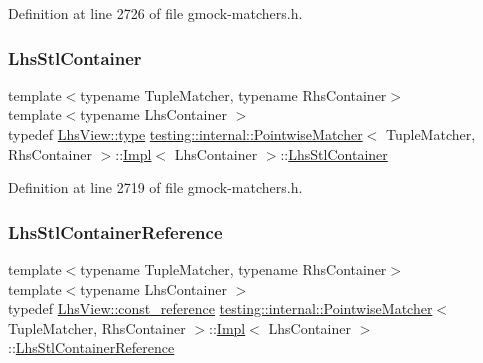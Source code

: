 Definition at line 2726 of file gmock-\/matchers.\+h.

\mbox{\label{classtesting_1_1internal_1_1PointwiseMatcher_1_1Impl_a23420b57b4cd6d83cec8afda746c27f2}} 
\subsubsection{\texorpdfstring{Lhs\+Stl\+Container}{LhsStlContainer}}
{\footnotesize\ttfamily template$<$typename Tuple\+Matcher, typename Rhs\+Container$>$ \\
template$<$typename Lhs\+Container $>$ \\
typedef \hyperlink{classtesting_1_1internal_1_1StlContainerView_a2b2c63a6dcdbfe63fb0ee121ebf463ba}{Lhs\+View\+::type} \hyperlink{classtesting_1_1internal_1_1PointwiseMatcher}{testing\+::internal\+::\+Pointwise\+Matcher}$<$ Tuple\+Matcher, Rhs\+Container $>$\+::\hyperlink{classtesting_1_1internal_1_1PointwiseMatcher_1_1Impl}{Impl}$<$ Lhs\+Container $>$\+::\hyperlink{classtesting_1_1internal_1_1PointwiseMatcher_1_1Impl_a23420b57b4cd6d83cec8afda746c27f2}{Lhs\+Stl\+Container}}



Definition at line 2719 of file gmock-\/matchers.\+h.

\mbox{\label{classtesting_1_1internal_1_1PointwiseMatcher_1_1Impl_a9df3eb0866f76d59dbdd35fafeb5590c}} 
\subsubsection{\texorpdfstring{Lhs\+Stl\+Container\+Reference}{LhsStlContainerReference}}
{\footnotesize\ttfamily template$<$typename Tuple\+Matcher, typename Rhs\+Container$>$ \\
template$<$typename Lhs\+Container $>$ \\
typedef \hyperlink{classtesting_1_1internal_1_1StlContainerView_a9cd4f6ed689b3938cdb7b3c4cbf1b36b}{Lhs\+View\+::const\+\_\+reference} \hyperlink{classtesting_1_1internal_1_1PointwiseMatcher}{testing\+::internal\+::\+Pointwise\+Matcher}$<$ Tuple\+Matcher, Rhs\+Container $>$\+::\hyperlink{classtesting_1_1internal_1_1PointwiseMatcher_1_1Impl}{Impl}$<$ Lhs\+Container $>$\+::\hyperlink{classtesting_1_1internal_1_1PointwiseMatcher_1_1Impl_a9df3eb0866f76d59dbdd35fafeb5590c}{Lhs\+Stl\+Container\+Reference}}



